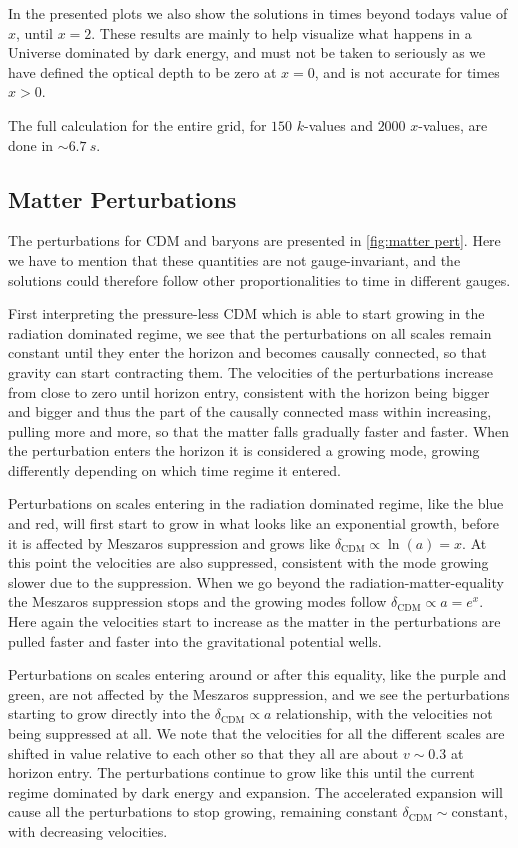 \documentclass[10pt,a4paper]{article}
\providecommand{\rCDM}
{\ensuremath{
\textrm{CDM}
}
}
\begin{document}
In the presented plots we also show the solutions in times beyond todays value of $x$, until $x=2$. These results are mainly to help visualize what happens in a Universe dominated by dark energy, and must not be taken to seriously as we have defined the optical depth to be zero at $x=0$, and is not accurate for times $x>0$.

The full calculation for the entire grid, for $150$ $k$-values and $2000$ $x$-values, are done in $\sim \SI{6.7}{s}$.

\subsection{Matter Perturbations}
\label{subsec:Results/Matter pert}
The perturbations for \rCDM and baryons are presented in \cref{fig:matter pert}. Here we have to mention that these quantities are not gauge-invariant, and the solutions could therefore follow other proportionalities to time in different gauges.

First interpreting the pressure-less \rCDM which is able to start growing in the radiation dominated regime, we see that the perturbations on all scales remain constant until they enter the horizon and becomes causally connected, so that gravity can start contracting them. The velocities of the perturbations increase from close to zero until horizon entry, consistent with the horizon being bigger and bigger and thus the part of the causally connected mass within increasing, pulling more and more, so that the matter falls gradually faster and faster. When the perturbation enters the horizon it is considered a growing mode, growing differently depending on which time regime it entered.

Perturbations on scales entering in the radiation dominated regime, like the blue and red, will first start to grow in what looks like an exponential growth, before it is affected by Meszaros suppression and grows like $\delta_{\rCDM} \propto \ln(a) = x$. At this point the velocities are also suppressed, consistent with the mode growing slower due to the suppression. When we go beyond the radiation-matter-equality the Meszaros suppression stops and the growing modes follow $\delta_{\rCDM} \propto a = e^x$. Here again the velocities start to increase as the matter in the perturbations are pulled faster and faster into the gravitational potential wells.

Perturbations on scales entering around or after this equality, like the purple and green, are not affected by the Meszaros suppression, and we see the perturbations starting to grow directly into the $\delta_{\rCDM} \propto a$ relationship, with the velocities not being suppressed at all. We note that the velocities for all the different scales are shifted in value relative to each other so that they all are about $v \sim 0.3$ at horizon entry. The perturbations continue to grow like this until the current regime dominated by dark energy and expansion. The accelerated expansion will cause all the perturbations to stop growing, remaining constant $\delta_{\rCDM} \sim \textrm{constant}$, with decreasing velocities.
\end{document}
